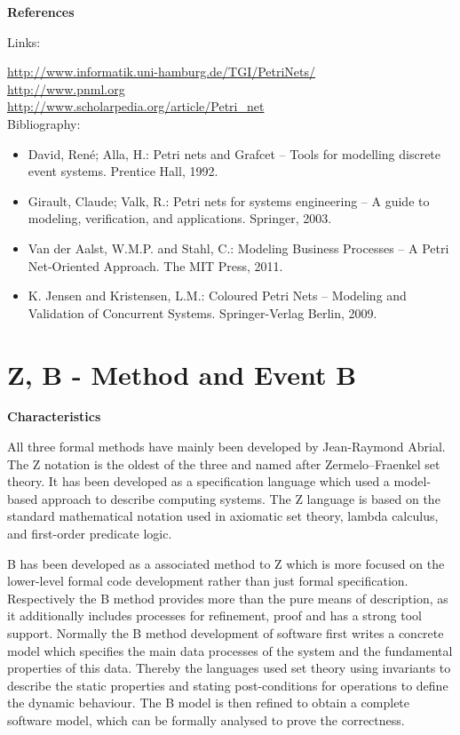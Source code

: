\documentclass{./template/openetcs_report}
\begin{document}
	\textbf{References}

Links:

\url{http://www.informatik.uni-hamburg.de/TGI/PetriNets/}\\[4pt]
\url{http://www.pnml.org}\\[4pt]
\url{http://www.scholarpedia.org/article/Petri_net} \\[4pt]

Bibliography:
\begin{itemize}
\item David, René; Alla, H.: Petri nets and Grafcet -- Tools for modelling discrete event systems. Prentice Hall, 1992.
\item Girault, Claude; Valk, R.: Petri nets for systems engineering -- A guide to modeling, verification, and applications. Springer, 2003.
\item Van der Aalst, W.M.P. and Stahl, C.: Modeling Business Processes -- A Petri Net-Oriented Approach. The MIT Press, 2011.
\item K. Jensen and Kristensen, L.M.: Coloured Petri Nets -- Modeling and Validation of Concurrent Systems. Springer-Verlag Berlin, 2009.
\end{itemize}



\section{Z, B - Method and Event B}


	\textbf{Characteristics}

All three formal methods have mainly been developed by Jean-Raymond Abrial. The Z notation is the oldest of the three  and named after Zermelo–Fraenkel set theory. It has been developed as a specification language which used a model-based approach to describe computing systems. The Z language is based on the standard mathematical notation used in axiomatic set theory, lambda calculus, and first-order predicate logic. 

 B has been developed as a associated method to Z which is more focused on the lower-level formal code development rather than just formal specification. Respectively the B method provides more than the pure means of description, as it additionally includes processes for refinement, proof and has a strong tool support. Normally the B method development of software first writes a concrete model which specifies the main data processes of the system and the fundamental properties of this data. Thereby the languages used set theory using invariants to describe the static properties and stating post-conditions for operations to define the dynamic behaviour. The B model is then refined to obtain a complete software model, which can be formally analysed to prove the correctness.
 
\end{document}
